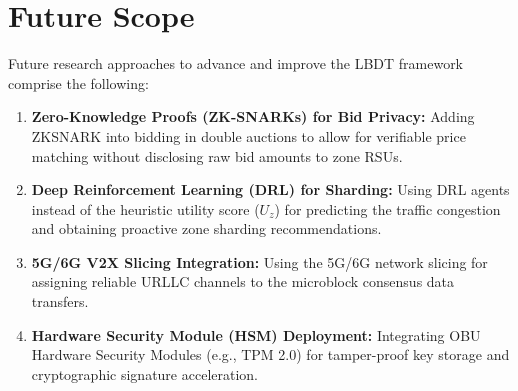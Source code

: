 \section{Future Scope}\label{sec:conclusion_future}
\noindent Future research approaches to advance and improve the LBDT framework comprise the following: 
\begin{enumerate}
    \item \textbf{Zero-Knowledge Proofs (ZK-SNARKs) for Bid Privacy:} Adding ZKSNARK into bidding in double auctions to allow for verifiable price matching without disclosing raw bid amounts to zone RSUs. 
    \item \textbf{Deep Reinforcement Learning (DRL) for Sharding:} Using DRL agents instead of the heuristic utility score ($U_z$) for predicting the traffic congestion and obtaining proactive zone sharding recommendations. 
    \item \textbf{5G/6G V2X Slicing Integration:} Using the 5G/6G network slicing for assigning reliable URLLC channels to the microblock consensus data transfers.
    \item \textbf{Hardware Security Module (HSM) Deployment:} Integrating OBU Hardware Security Modules (e.g., TPM 2.0) for tamper-proof key storage and cryptographic signature acceleration.
\end{enumerate}
